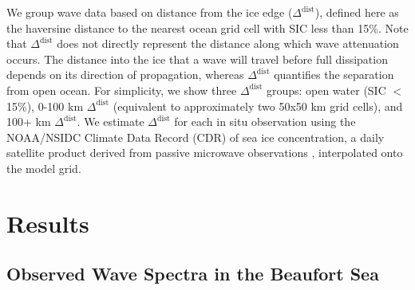 \documentclass [11pt, proquest] {uwthesis}[2020/02/24]
\begin{document}
We group wave data based on distance from the ice edge ($\Delta^{\mathrm{dist}}$), defined here as the haversine distance to the nearest ocean grid cell with SIC less than 15\%. Note that $\Delta^{\mathrm{dist}}$ does not directly represent the distance along which wave attenuation occurs. The distance into the ice that a wave will travel before full dissipation depends on its direction of propagation, whereas $\Delta^{\mathrm{dist}}$ quantifies the separation from open ocean. For simplicity, we show three $\Delta^{\mathrm{dist}}$ groups: open water (SIC $<$ 15\%), 0-100 km $\Delta^{\mathrm{dist}}$ (equivalent to approximately two 50x50 km grid cells), and 100+ km $\Delta^{\mathrm{dist}}$. We estimate $\Delta^{\mathrm{dist}}$ for each in situ observation using the NOAA/NSIDC Climate Data Record (CDR) of sea ice concentration, a daily satellite product derived from passive microwave observations \cite{Meier2017cdr3, essd-5-311-2013, Meier2021cdr4}, interpolated onto the model grid.  
 

 
\chapter{Results} \label{sec:res}

\section{Observed Wave Spectra in the Beaufort Sea} \label{obs-results}
\end{document}
